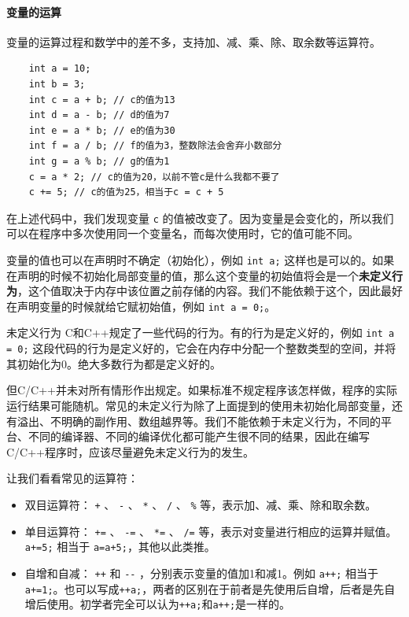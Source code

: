 \paragraph{变量的运算}

变量的运算过程和数学中的差不多，支持加、减、乘、除、取余数等运算符。
\begin{verbatim}
    int a = 10;
    int b = 3;
    int c = a + b; // c的值为13
    int d = a - b; // d的值为7
    int e = a * b; // e的值为30
    int f = a / b; // f的值为3，整数除法会舍弃小数部分
    int g = a % b; // g的值为1
    c = a * 2; // c的值为20，以前不管c是什么我都不要了
    c += 5; // c的值为25，相当于c = c + 5
\end{verbatim}
在上述代码中，我们发现变量 \verb|c| 的值被改变了。因为变量是会变化的，所以我们可以在程序中多次使用同一个变量名，而每次使用时，它的值可能不同。

变量的值也可以在声明时不确定（初始化），例如 \texttt{int a;} 这样也是可以的。如果在声明的时候不初始化局部变量的值，那么这个变量的初始值将会是一个\textbf{未定义行为}，这个值取决于内存中该位置之前存储的内容。我们不能依赖于这个，因此最好在声明变量的时候就给它赋初始值，例如 \texttt{int a = 0;}。

\begin{definition}{未定义行为}{}
    C和C++规定了一些代码的行为。有的行为是定义好的，例如 \texttt{int a = 0;} 这段代码的行为是定义好的，它会在内存中分配一个整数类型的空间，并将其初始化为0。绝大多数行为都是定义好的。

    但C/C++并未对所有情形作出规定。如果标准不规定程序该怎样做，程序的实际运行结果可能随机。常见的未定义行为除了上面提到的使用未初始化局部变量，还有溢出、不明确的副作用、数组越界等。我们不能依赖于未定义行为，不同的平台、不同的编译器、不同的编译优化都可能产生很不同的结果，因此在编写C/C++程序时，应该尽量避免未定义行为的发生。
\end{definition}

让我们看看常见的运算符：
\begin{itemize}
    \item 双目运算符： \verb|+| 、 \verb|-| 、 \verb|*| 、 \verb|/| 、 \verb|%| 等，表示加、减、乘、除和取余数。
    \item 单目运算符： \verb|+=| 、 \verb|-=| 、 \verb|*=| 、 \verb|/=| 等，表示对变量进行相应的运算并赋值。\texttt{a+=5;} 相当于 \texttt{a=a+5;}，其他以此类推。
    \item 自增和自减： \verb|++| 和 \verb|--| ，分别表示变量的值加1和减1。例如 \texttt{a++;} 相当于 \texttt{a+=1;}。也可以写成\texttt{++a;}，两者的区别在于前者是先使用后自增，后者是先自增后使用。初学者完全可以认为\texttt{++a;}和\texttt{a++;}是一样的。
\end{itemize}

